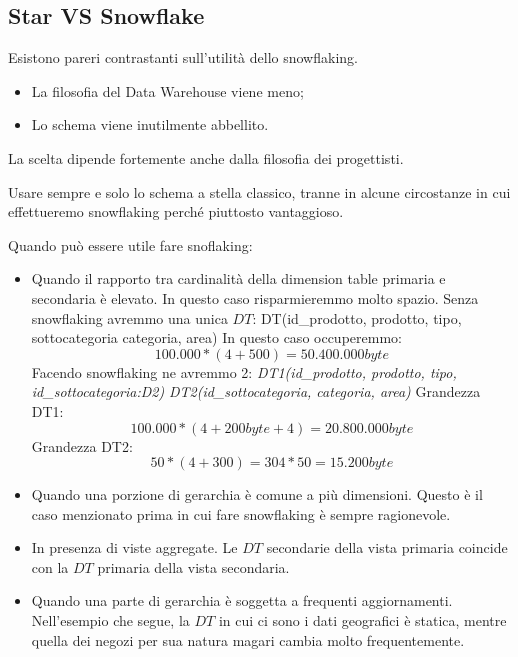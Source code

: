 \subsection{Star VS Snowflake}
Esistono pareri contrastanti sull'utilità dello snowflaking.
\begin{itemize}
	\item La filosofia del Data Warehouse viene meno;
	\item Lo schema viene inutilmente abbellito.
\end{itemize}
La scelta dipende fortemente anche dalla filosofia dei progettisti.
\begin{warn}
	Usare sempre e solo lo schema a stella classico, tranne in alcune circostanze in cui effettueremo snowflaking perché piuttosto vantaggioso.
\end{warn}
\noindent Quando può essere utile fare snoflaking:
\begin{itemize}
	\item Quando il rapporto tra cardinalità della dimension table primaria e secondaria è elevato. In questo caso risparmieremmo molto spazio.
	Senza snowflaking avremmo una unica $DT$:\newline
	DT(id\_prodotto, prodotto, tipo, sottocategoria categoria, area)\newline
	In questo caso occuperemmo:
	$$100.000*(4 + 500) = 50.400.000 byte$$
	Facendo snowflaking ne avremmo 2:\newline
	\textit{DT1(id\_prodotto, prodotto, tipo, id\_sottocategoria:D2)}\newline
	\textit{DT2(id\_sottocategoria, categoria, area)}\newline
	Grandezza DT1:
	$$100.000 * (4 + 200 byte + 4) = 20.800.000 byte$$\newline
	Grandezza DT2:
	$$50 * (4 + 300) = 304 * 50 = 15.200 byte$$
	\item Quando una porzione di gerarchia è comune a più dimensioni. Questo è il caso menzionato prima in cui fare snowflaking è sempre ragionevole.
	\item In presenza di viste aggregate. Le $DT$ secondarie della vista primaria coincide con la $DT$ primaria della vista secondaria.
	\item Quando una parte di gerarchia è soggetta a frequenti aggiornamenti. Nell'esempio che segue, la $DT$ in cui ci sono i dati geografici è statica, mentre quella dei negozi per sua natura magari cambia molto frequentemente.
\end{itemize}

